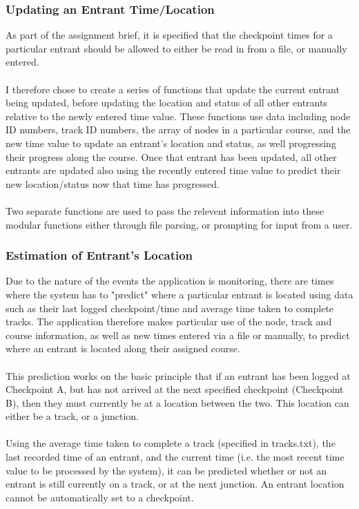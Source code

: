 \documentclass{article}
\begin{document}
\subsubsection{Updating an Entrant Time/Location}

As part of the assignment brief, it is specified that the checkpoint times for a particular entrant should be allowed to either be read in from a file, or manually entered. \\\\
I therefore chose to create a series of functions that update the current entrant being updated, before updating the location and status of all other entrants relative to the newly entered time value. These functions use data including node ID numbers, track ID numbers, the array of nodes in a particular course, and the new time value to update an entrant's location and status, as well progressing their progress along the course. Once that entrant has been updated, all other entrants are updated also using the recently entered time value to predict their new location/status now that time has progressed.\\\\
Two separate functions are used to pass the relevent information into these modular functions either through file parsing, or prompting for input from a user. 

\subsubsection{Estimation of Entrant's Location}

Due to the nature of the events the application is monitoring, there are times where the system has to "predict" where a particular entrant is located using data such as their last logged checkpoint/time and average time taken to complete tracks. The application therefore makes particular use of the node, track and course information, as well as new times entered via a file or manually, to predict where an entrant is located along their assigned course. \\\\
This prediction works on the basic principle that if an entrant has been logged at Checkpoint A, but has not arrived at the next specified checkpoint (Checkpoint B), then they must currently be at a location between the two. This location can either be a track, or a junction.\\\\ 
Using the average time taken to complete a track (specified in tracks.txt), the last recorded time of an entrant, and the current time (i.e. the most recent time value to be processed by the system), it can be predicted whether or not an entrant is still currently on a track, or at the next junction. An entrant location cannot be automatically set to a checkpoint.
\end{document}

